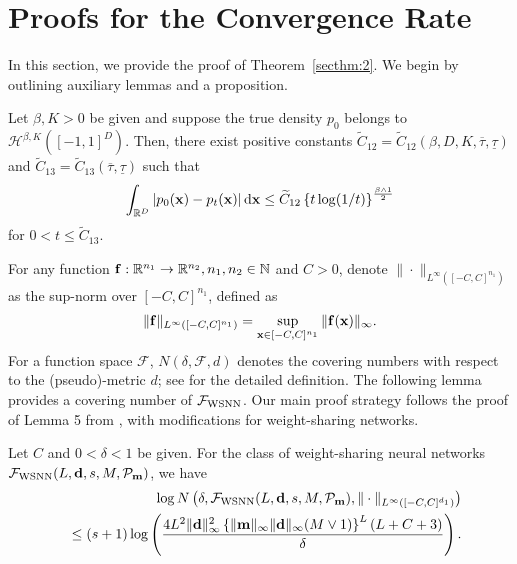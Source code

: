 \documentclass[twoside,11pt]{article}
\def\cF{\mathcal F}
\def\cH{\mathcal H}
\def\cL{\mathcal L}
\def\cP{\mathcal P}
\newcommand{\bd}{{\bf d}}
\newcommand{\bff}{{\bf f}}
\newcommand{\bfm}{{\bf m}}
\newcommand{\bx}{{\bf x}}
\newcommand{\bbR}{{\mathbb R}}
\newcommand{\bbN}{{\mathbb N}}
\newcommand{\bean}{\setlength\arraycolsep{1pt}\begin{eqnarray*}}
\newcommand{\eean}{\end{eqnarray*}}
\def\d{{\rm d}}
\begin{document}
\section{Proofs for the Convergence Rate}

In this section, we provide the proof of Theorem~\ref{secthm:2}.
We begin by outlining auxiliary lemmas and a proposition.

\begin{lemma}
\label{secsc:p0pt}
Let $\beta, K > 0$ be given and suppose the true density $p_0$ belongs to $\cH^{\beta, K}([-1,1]^{D})$. 
Then, there exist positive constants $\widetilde C_{12} = \widetilde C_{12}(\beta, D, K ,\overline{\tau}, \underline{\tau})$ and $ \widetilde C_{13} = \widetilde C_{13}(\overline{\tau}, \underline{\tau})$ such that
\bean
\int_{\bbR^{D}} \left\vert p_0(\bx) - p_t(\bx) \right\vert \d \bx \leq \widetilde C_{12} \left\{ t \log (1/t) \right\}^{\frac{\beta \wedge 1}{2}} 
\eean
for $0 < t \leq \widetilde C_{13}$.
\end{lemma}

For any function $\bff : \bbR^{n_1} \to \bbR^{n_2}, n_1, n_2 \in \bbN$ and $C > 0$, denote $\| \cdot \|_{L^{\infty}( [-C,C]^{n_1} ) }$ as the sup-norm over $[-C,C]^{n_1}$, defined as 
\bean
\| \bff \|_{L^{\infty}( [-C,C]^{n_1} ) }
= \sup_{\bx \in [-C,C]^{n_1}} \| \bff(\bx) \|_{\infty}.
\eean
For a function space $\cF$, $N(\delta,\cF,d)$ denotes the covering numbers with respect to the (pseudo)-metric $d$; see \citet{van1996weak} for the detailed definition.
The following lemma provides a covering number of $\cF_{\rm WSNN}$.
Our main proof strategy follows the proof of Lemma 5 from \citet{schmidt2020nonparametric}, with modifications for weight-sharing networks.

\begin{lemma}[Covering number of $\cF_{\rm WSNN}$]
\label{sec:covering}
Let $C$ and $ 0 <  \delta < 1 $ be given.
For the class of weight-sharing neural networks $ \cF_{\rm WSNN} ( L, \bd, s,  M, \cP_{\bfm})$,
we have
\bean
&& \log N \left(\delta, \cF_{\rm WSNN}(L,\bd,s,M,\cP_{\bfm}), \| \cdot \|_{L^{\infty}([-C,C]^{d_{1}})} \right) 
\\
&& \leq (s+1) \log \left( \frac{4 L^2 \|\bd\|_{\infty}^2 \left\{  \| \bfm\|_{\infty} \|\bd\|_{\infty} (M \vee 1) \right\}^{L} \left(L + C + 3 \right)   }{\delta}  \right).
\eean
\end{lemma}

\end{document}
